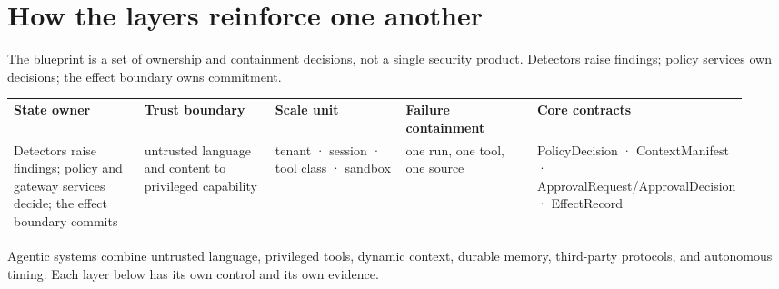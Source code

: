 \section{How the layers reinforce one another}

The blueprint is a set of ownership and containment decisions, not a single security product. Detectors raise findings; policy services own decisions; the effect boundary owns commitment.\par

\BookTableStart
\fontsize{7.2}{9}\selectfont
\begin{tabular}{@{}Y{0.1880\linewidth}Y{0.1880\linewidth}Y{0.1880\linewidth}Y{0.1880\linewidth}Y{0.1880\linewidth}@{}}
\color{white}\bfseries \textbf{State owner} & \color{white}\bfseries \textbf{Trust boundary} & \color{white}\bfseries \textbf{Scale unit} & \color{white}\bfseries \textbf{Failure containment} & \color{white}\bfseries \textbf{Core contracts} \\
Detectors raise findings; policy and gateway services decide; the effect boundary commits & untrusted language and content to privileged capability & tenant · session · tool class · sandbox & one run, one tool, one source & PolicyDecision · ContextManifest · ApprovalRequest/ApprovalDecision · EffectRecord \\
\end{tabular}
\BookTableEnd

Agentic systems combine untrusted language, privileged tools, dynamic context, durable memory, third-party protocols, and autonomous timing. Each layer below has its own control and its own evidence.\par


